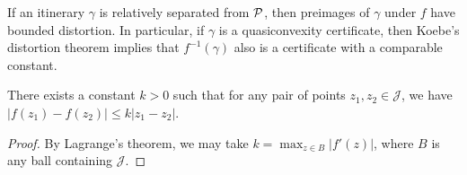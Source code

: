 If an itinerary $\gamma$ is relatively separated from $\operatorname{\mathcal P}$, then preimages of $\gamma$ under $f$ have bounded distortion. In particular, if $\gamma$ is a quasiconvexity certificate, then Koebe's distortion theorem implies that $f^{-1}(\gamma)$ also is a certificate with a comparable constant.

\begin{comment}
\begin{lemma}
The Julia set $\mathcal J$ is \emph{quasi-locally connected}, meaning that there exists a constant $L>0$ such that for every two points $z,w \in \mathcal J$, the itinerary $\gamma_{z,w}$ is contained in the ball $B(z_1, L|z_1-z_2|)$.
\end{lemma}
\end{comment}

\begin{lemma}
There exists a constant $k>0$ such that for any pair of points $z_1, z_2 \in \mathcal J$, we have $|f(z_1)-f(z_2)| \leq k|z_1-z_2|$.
\end{lemma}

\begin{proof}
By Lagrange's theorem, we may take $k=\max_{z \in B} |f'(z)|$, where $B$ is any ball containing $\mathcal J$. 
\end{proof}


\begin{comment}

\begin{lemma}
For any pair $(z_1,z_2)$ of distinct points on the Julia set of $f(z)=z^2+\frac 14$,
if $f(z_1)=f(z_2)$ then $|z_1-z_2|\geq c_0$ for a universal constant $c_0 > 0$.
\end{lemma}

\begin{proof}
If $f(z_1)=f(z_2)$ then $z_1^2=z_2^2$, and the claim is trivial.
\end{proof}
\end{comment}

\begin{comment}
	A more general argument: Pulling back to the exterior unit disk, the result holds for $z \mapsto z^2$. \textbf{Not convincing? Use that $\mathcal J$ is a Jordan curve.}
\end{comment}

